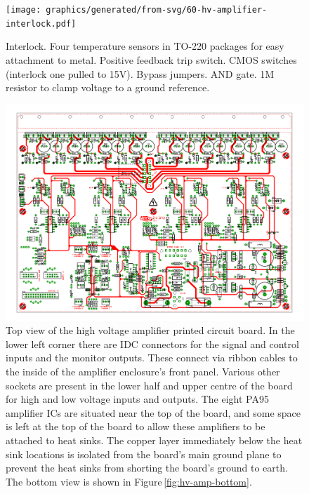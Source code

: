 \begin{figure}
  \centering
  \texttt{[image: graphics/generated/from-svg/60-hv-amplifier-interlock.pdf]}
  \caption{\label{fig:hv-amp-interlock}Interlock. Four temperature sensors in TO-220 packages for easy attachment to metal. Positive feedback trip switch. CMOS switches (interlock one pulled to 15V). Bypass jumpers. AND gate. 1M resistor to clamp voltage to a ground reference.}
\end{figure}

\begin{figure}
  \centering
  \includegraphics[width=\columnwidth]{graphics/60-hv-amp-top.pdf}
  \caption{\label{fig:hv-amp-top}Top view of the high voltage amplifier printed circuit board. In the lower left corner there are IDC connectors for the signal and control inputs and the monitor outputs. These connect via ribbon cables to the inside of the amplifier enclosure's front panel. Various other sockets are present in the lower half and upper centre of the board for high and low voltage inputs and outputs. The eight PA95 amplifier ICs are situated near the top of the board, and some space is left at the top of the board to allow these amplifiers to be attached to heat sinks. The copper layer immediately below the heat sink locations is isolated from the board's main ground plane to prevent the heat sinks from shorting the board's ground to earth. The bottom view is shown in Figure\,\ref{fig:hv-amp-bottom}.}
\end{figure}

